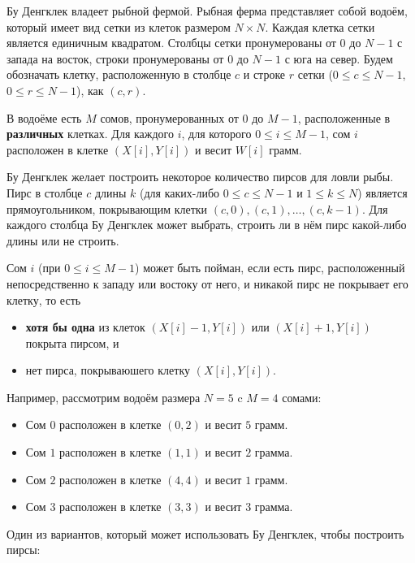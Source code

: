 Бу Денгклек владеет рыбной фермой.
Рыбная ферма представляет собой водоём, который имеет вид сетки из клеток размером $N \times N$.
Каждая клетка сетки является единичным квадратом.
Столбцы сетки пронумерованы от $0$ до $N - 1$ с запада на восток, строки пронумерованы от $0$ до $N - 1$ с юга на север. 
Будем обозначать клетку, расположенную в столбце $c$ и строке $r$ сетки ($0 \le c \le N - 1$, $0 \le r \le N - 1$), как $(c, r)$.

В водоёме есть $M$ сомов, пронумерованных от $0$ до $M - 1$, расположенные в  \textbf{различных} клетках.
Для каждого $i$, для которого $0 \le i \le M - 1$, сом $i$ расположен в клетке $(X[i], Y[i])$ и весит $W[i]$ грамм.

Бу Денгклек желает построить некоторое количество пирсов для ловли рыбы.
Пирс в столбце $c$ длины $k$ (для каких-либо $0 \le c \le N - 1$ и $1 \le k \le N$) является прямоугольником, покрывающим клетки $(c, 0), (c, 1), \ldots, (c, k - 1)$.
Для каждого столбца Бу Денгклек может выбрать, строить ли в нём пирс какой-либо длины или не строить. 

Сом $i$ (при $0 \le i \le M - 1$) может быть пойман, если есть пирс, расположенный непосредственно к западу или востоку от него, и никакой пирс не покрывает его клетку, то есть
\begin{itemize}
    \item  \textbf{хотя бы одна} из клеток $(X[i] - 1, Y[i])$ или $(X[i] + 1, Y[i])$ покрыта пирсом, и
    \item нет пирса, покрываюшего клетку $(X[i], Y[i])$.

\end{itemize}

Например, рассмотрим водоём размера $N = 5$ c $M = 4$ сомами: 
\begin{itemize}
    \item  Сом $0$ расположен в клетке $(0, 2)$ и весит $5$ грамм.
    \item Сом $1$ расположен в клетке $(1, 1)$ и весит $2$ грамма.
    \item Сом $2$ расположен в клетке $(4, 4)$ и весит $1$ грамм.
    \item Сом $3$ расположен в клетке $(3, 3)$ и весит $3$ грамма.
\end{itemize}
Один из вариантов, который может использовать Бу Денгклек, чтобы построить пирсы:


